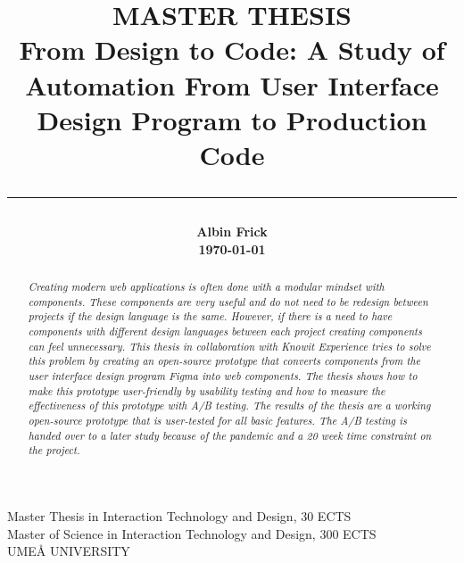 \title{
    \Large MASTER THESIS\\
    \vspace{5mm}
    \huge \bf
        From Design to Code: A Study of Automation From User Interface Design Program to Production Code\\
        \noindent\rule{\textwidth}{0.4pt}

}

\date{} %
\author{
    \LARGE\bf{Albin Frick}\\
    \today
}

\maketitle
\vspace*{\fill}
\begin{center}
Master Thesis in Interaction Technology and Design, 30 ECTS\\
Master of Science in Interaction Technology and Design, 300 ECTS\\
UMEÅ UNIVERSITY
\end{center}
\newpage
\tableofcontents
\newpage
{}
\begin{abstract}
\textit{Creating modern web applications is often done with a modular mindset with components. These components are very useful and do not need to be redesign between projects if the design language is the same. However, if there is a need to have components with different design languages between each project creating components can feel unnecessary. This thesis in collaboration with Knowit Experience tries to solve this problem by creating an open-source prototype that converts components from the user interface design program Figma into web components. The thesis shows how to make this prototype user-friendly by usability testing and how to measure the effectiveness of this prototype with A/B testing. The results of the thesis are a working open-source prototype that is user-tested for all basic features. The A/B testing is handed over to a later study because of the pandemic and a 20 week time constraint on the project.}

\end{abstract}
\newpage
